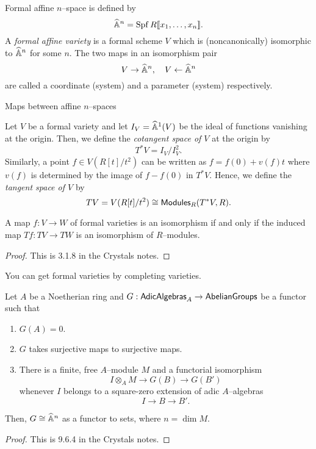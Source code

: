 \begin{definition}
Formal affine $n$--space is defined by \[\widehat{\mathbb{A}}^n = \operatorname{Spf} R\llbracket x_1, \ldots, x_n\rrbracket.\]  A \textit{formal affine variety} is a formal scheme $V$ which is (noncanonically) isomorphic to $\widehat{\mathbb{A}}^n$ for some $n$.  The two maps in an isomorphism pair \[V \to \widehat{\mathbb{A}}^n, \quad V \leftarrow \widehat{\mathbb{A}}^n\] are called a coordinate (system) and a parameter (system) respectively.
\end{definition}

Maps between affine $n$--spaces

\begin{definition}
Let $V$ be a formal variety and let $I_V = \widehat{\mathbb{A}}^1(V)$ be the ideal of functions vanishing at the origin.  Then, we define the \textit{cotangent space of $V$} at the origin by \[T^* V = I_V / I_V^2.\]  Similarly, a point $f \in V(R[t] / t^2)$ can be written as $f = f(0) + v(f) t$ where $v(f)$ is determined by the image of $f - f(0)$ in $T^* V$.  Hence, we define the \textit{tangent space of $V$} by \[TV = V(R[t] / t^2) \cong \mathsf{Modules}_R(T^* V, R).\]
\end{definition}

\begin{theorem}
A map $f: V \to W$ of formal varieties is an isomorphism if and only if the induced map $Tf: TV \to TW$ is an isomorphism of $R$--modules.
\end{theorem}
\begin{proof}
This is 3.1.8 in the Crystals notes.
\end{proof}

\begin{remark}
You can get formal varieties by completing varieties.
\end{remark}


\begin{theorem}\label{DetectingFormalVarieties}
Let $A$ be a Noetherian ring and $G: \mathsf{AdicAlgebras}_A \to \mathsf{AbelianGroups}$ be a functor such that
\begin{enumerate}
\item $G(A) = 0$.
\item $G$ takes surjective maps to surjective maps.
\item There is a finite, free $A$--module $M$ and a functorial isomorphism \[I \otimes_A M \to G(B) \to G(B')\] whenever $I$ belongs to a square-zero extension of adic $A$--algebras \[I \to B \to B'.\]
\end{enumerate}
Then, $G \cong \widehat{\mathbb{A}}^n$ as a functor to sets, where $n = \dim M$.
\end{theorem}
\begin{proof}
This is 9.6.4 in the Crystals notes.
\end{proof}

